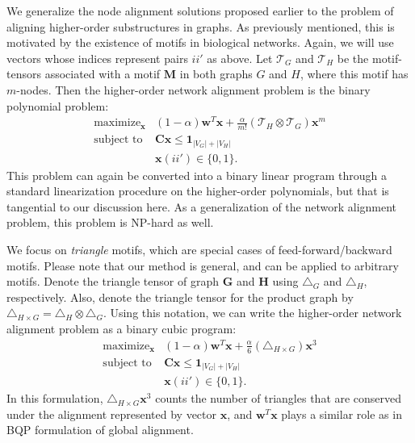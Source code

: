 \documentclass[10pt, journal, compsoc, final]{IEEEtran}
\newcommand{\bs}[1]{\boldsymbol{#1}}
\newcommand{\Vector}[1]{\bs{#1}}
\newcommand{\Matrix}[1]{\mathbf{#1}}
\newcommand{\Tensor}[1]{\mathbf{\mathcal{#1}}}
\newcommand{\Graph}[1]{\mathit{\mathbf{\bs{#1}}}}
\begin{document}
We generalize the node alignment solutions proposed earlier to the problem of aligning
higher-order substructures in graphs. As previously mentioned, 
this is motivated by the existence of motifs in
biological networks. Again, we will use vectors whose indices represent pairs $ii'$ as above. 
Let $\Tensor{T}_G$ and $\Tensor{T}_H$ be the motif-tensors associated with a motif $\Graph{M}$
in both graphs $G$ and $H$, where this motif has $m$-nodes. Then the 
higher-order network alignment problem is the binary polynomial problem:
\begin{equation}
 \begin{array}{ll}
  \displaystyle \mathop{\text{maximize}}_{\Vector{x}} & \displaystyle (1-\alpha) \Vector{w}^T \Vector{x} + \frac{\alpha}{m!} (\Tensor{T}_H \otimes \Tensor{T}_G) \Vector{x}^{m} \\
 \text{subject to} & \Matrix{C} \Vector{x} \le \Vector{1}_{|V_G|+|V_H|} \\
  & \Vector{x}(ii') \in \{0, 1\}.
 \end{array}
 \label{eq:HONA-BP}
\end{equation}
This problem can again be converted into a binary linear program through a standard
linearization procedure on the higher-order polynomials, but that is tangential
to our discussion here. As a generalization of the network alignment problem,
this problem is NP-hard as well.
 
We focus on \textit{triangle} motifs,
which are special cases of feed-forward/backward motifs. Please note that our method
is general, and can be applied to arbitrary motifs.
Denote the triangle tensor of graph $\Graph{G}$ and $\Graph{H}$ using 
$\Tensor{\bigtriangleup}_G$ and $\Tensor{\bigtriangleup}_H$, respectively. Also, denote the 
triangle tensor for the product graph by $\Tensor{\bigtriangleup}_{H \times G} = 
\Tensor{\bigtriangleup}_H \otimes \Tensor{\bigtriangleup}_G$. Using this notation, we can write 
the higher-order network alignment problem as a binary cubic program:
\begin{equation}
 \begin{array}{ll}
  \displaystyle \mathop{\text{maximize}}_{\Vector{x}} & \displaystyle (1-\alpha) \Vector{w}^T \Vector{x} + \frac{\alpha}{6} (\Tensor{\bigtriangleup}_{H \times G}) \Vector{x}^{3} \\
 \text{subject to} & \Matrix{C} \Vector{x} \le \Vector{1}_{|V_G|+|V_H|} \\
  & \Vector{x}(ii') \in \{0, 1\}.
 \end{array}
 \label{eq:TAME}
\end{equation}
In this formulation, $\Tensor{\bigtriangleup}_{H \times G} \Vector{x}^3$ counts the number of 
triangles that are conserved under the alignment represented by vector $\Vector{x}$, and 
$\Vector{w}^T\Vector{x}$ plays a similar role as in BQP formulation of global alignment. 
\end{document}
